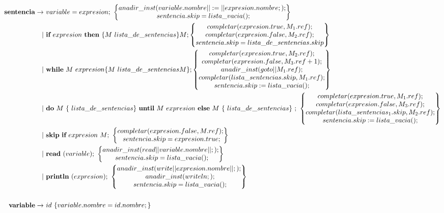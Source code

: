 \documentclass[12pt,a4paper,landscape]{article}
\theoremstyle{mytheor}
\begin{document}
\begin{alignat*}{2}
  \text{\textbf{sentencia}} \to\ & variable = expresion;\ \begin{Bmatrix} anadir\_inst(variable.nombre||:=||expresion.nombre;);\\ sentencia.skip=lista\_vacia();\end{Bmatrix}\\
 |\ &\textbf{if}\ expresion\ \textbf{then}\ \{M\ lista\_de\_sentencias\}M; \begin{Bmatrix} completar(expresion.true,M_1.ref); \\ completar(expresion.false,M_2.ref);\\ sentencia.skip=lista\_de\_sentencias.skip \end{Bmatrix} \\
 |\ &\textbf{while}\ M\ expresion \{M\ lista\_de\_sentencias M\}; \begin{Bmatrix} completar(expresion.true,M_2.ref); \\ completar(expresion.false,M_3.ref+1);\\ anadir\_inst(goto||M_1.ref);\\completar(lista\_sentencias.skip,M_1.ref);\\sentencia.skip:=lista\_vacia(); \end{Bmatrix} \\
 |\ &\textbf{do}\ M\ \{\ lista\_de\_sentencias \}\ \textbf{until}\ M\ expresion\ \textbf{else}\ M\ \{\ lista\_de\_sentencias\}\ ;\ \begin{Bmatrix} completar(expresion.true,M_1.ref); \\ completar(expresion.false,M_3.ref);\\ completar(lista\_sentencias_1.skip,M_2.ref);\\sentencia.skip:=lista\_vacia(); \end{Bmatrix} \\
 |\ &\textbf{skip}\ \textbf{if}\ expresion\ M;\ \begin{Bmatrix} completar(expresion.false,M.ref); \\ sentencia.skip =expresion.true; \end{Bmatrix}\\
 |\ &\textbf{read}\ (variable);\ \begin{Bmatrix} anadir\_inst(read||variable.nombre||;);\\ sentencia.skip=lista\_vacia();\end{Bmatrix}\\
 |\ &\textbf{println} \ (expresion);\  \begin{Bmatrix} anadir\_inst(write||expresion.nombre||;); \\ anadir\_inst(writeln;); \\ sentencia.skip=lista\_vacia(); \end{Bmatrix}\\\\
      \text{\textbf{variable}} \to\ & id\ \{variable.nombre = id.nombre;\} 
\end{alignat*}
\end{document}
